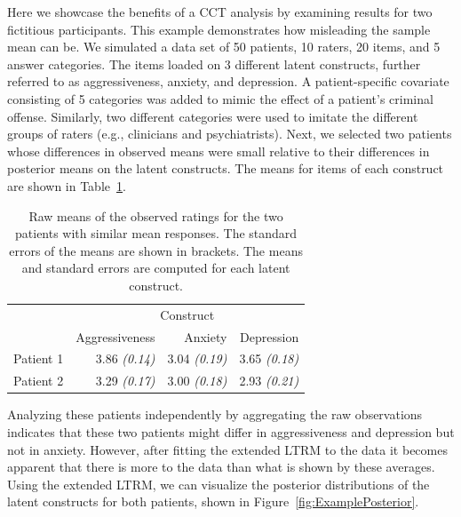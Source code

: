 \documentclass[a4paper]{article}
\newcommand{\SE}[1]{\emph{({#1})}}
\begin{document}
Here we showcase the benefits of a CCT analysis by examining results for two fictitious participants. This example demonstrates how misleading the sample mean can be. We simulated a data set of 50 patients, 10 raters, 20 items, and 5 answer categories. The items loaded on 3 different latent constructs, further referred to as aggressiveness, anxiety, and depression. A patient-specific covariate consisting of 5 categories was added to mimic the effect of a patient's criminal offense. Similarly, two different categories were used to imitate the different groups of raters (e.g., clinicians and psychiatrists). Next, we selected two patients whose differences in observed means were small relative to their differences in posterior means on the latent constructs. The means for items of each construct are shown in Table~\ref{tb:rawMeans}.
\begin{table}[!ht]
	\centering
	\caption{Raw means of the observed ratings for the two patients with similar mean responses. The standard errors of the means are shown in brackets. The means and standard errors are computed for each latent construct.}%
	\label{tb:rawMeans}
	\begin{tabular}{rrrr}
		\toprule
		\multicolumn{1}{c}{} & \multicolumn{3}{c}{Construct}\\%
		\cmidrule[0.4pt]{2-4}
		& Aggressiveness & Anxiety & Depression\\%
		\midrule
		Patient 1 & 3.86 \SE{0.14} & 3.04 \SE{0.19} & 3.65 \SE{0.18} \\%
		Patient 2 & 3.29 \SE{0.17} & 3.00 \SE{0.18} & 2.93 \SE{0.21} \\%
		\bottomrule
	\end{tabular}
\end{table}
Analyzing these patients independently by aggregating the raw observations indicates that these two patients might differ in aggressiveness and depression but not in anxiety. However, after fitting the extended LTRM to the data it becomes apparent that there is more to the data than what is shown by these averages. Using the extended LTRM, we can visualize the posterior distributions of the latent constructs for both patients, shown in Figure~\ref{fig:ExamplePosterior}.
\end{document}
